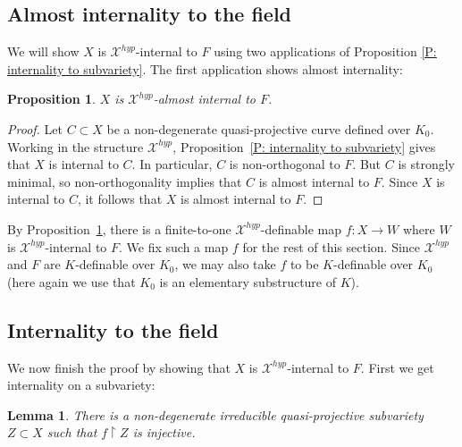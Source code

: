 \documentclass{amsart}
\newtheorem{lemma}[theorem]{Lemma}
\newtheorem{proposition}[theorem]{Proposition}
\theoremstyle{definition}
\begin{document}
\subsection{Almost internality to the field}

We will show $X$ is $\mathcal X^{hyp}$-internal to $F$ using two applications of Proposition \ref{P: internality to subvariety}. The first application shows almost internality:


\begin{proposition}\label{P: X almost internal to F}
$X$ is $\mathcal X^{hyp}$-almost internal to $F$.
\end{proposition}

\begin{proof}
Let $C \subset X$ be a non-degenerate quasi-projective curve defined over $K_0$. Working in the structure $\mathcal X^{hyp}$, Proposition~\ref{P: internality to subvariety} gives that $X$ is internal to $C$. In particular, $C$ is non-orthogonal to $F$. But $C$ is strongly minimal, so non-orthogonality implies that $C$ is almost internal to $F$. Since $X$ is internal to $C$, it follows that $X$ is almost internal to $F$.
\end{proof}

By Proposition~\ref{P: X almost internal to F}, there is a finite-to-one $\mathcal{X}^{hyp}$-definable map $f:X\rightarrow W$ where $W$ is $\mathcal X^{hyp}$-internal to $F$. We fix such a map $f$ for the rest of this section. Since $\mathcal X^{hyp}$ and $F$ are $K$-definable over $K_0$, we may also take $f$ to be $K$-definable over $K_0$ (here again we use that $K_0$ is an elementary substructure of $K$).

\subsection{Internality to the field}

We now finish the proof by showing that $X$ is $\mathcal X^{hyp}$-internal to $F$. First we get internality on a subvariety:

\begin{lemma}\label{L: generically injective restriction}
There is a non-degenerate irreducible quasi-projective subvariety $Z \subset X$ such that $f\restriction Z$ is injective.
\end{lemma}
\end{document}
